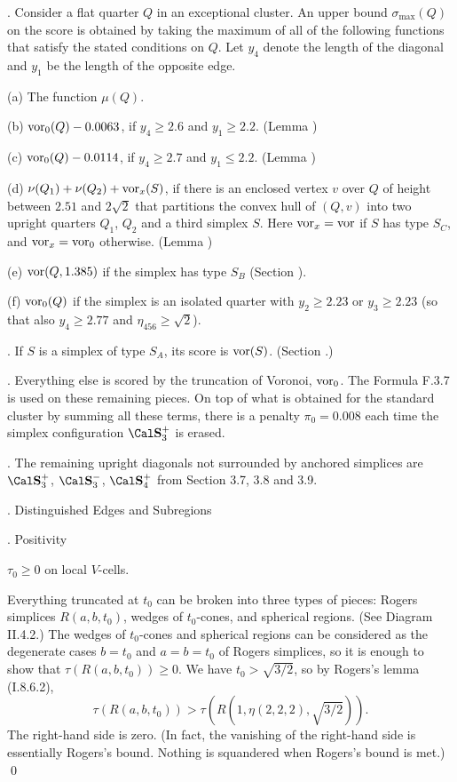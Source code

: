 \smallskip
{}.  Consider a flat quarter $Q$
in an exceptional cluster.  An upper bound $\sigma_{\max}(Q)$
on the score is obtained by taking the maximum 
of all of the following
functions that satisfy the stated conditions on $Q$.  Let $y_4$ denote
the length of the diagonal and $y_1$ be the length of the opposite edge.

(a)  The function $\mu(Q)$.

(b)  $\operatorname{vor}_0(Q) - 0.0063$, if $y_4\ge 2.6$ and $y_1\ge 2.2$.\hfill
	(Lemma )

(c)  $\operatorname{vor}_0(Q) - 0.0114$, if $y_4\ge 2.7$ and $y_1\le 2.2$.
	\hfill (Lemma )

(d)  $\nu(Q_1)+\nu(Q_2)+\operatorname{vor}_x(S)$, if there is an enclosed vertex
	$v$ over $Q$ of height between $2.51$ and $2\sqrt{2}$ that
	partitions the convex hull of $(Q,v)$ into two upright quarters
	$Q_1$, $Q_2$ and a third simplex $S$. Here $\operatorname{vor}_x=\operatorname{vor}$
	if $S$ has type $S_C$, and $\operatorname{vor}_x=\operatorname{vor}_0$ otherwise.
	\hfill (Lemma )

(e)  $\operatorname{vor}(Q,1.385)$ if the simplex has type $S_B$ (Section ).

(f) $\operatorname{vor}_0(Q)$ if the simplex is an isolated quarter with 
	$y_2\ge2.23$ or $y_3\ge2.23$ (so that also $y_4\ge2.77$
	and $\eta_{456}\ge\sqrt2$).

\smallskip

.   If $S$ is a simplex of type $S_A$, its score is $\operatorname{vor}(S)$.
(Section .)

\smallskip

.  Everything else is scored by the truncation of Voronoi, $\operatorname{vor}_0$.
	The Formula F.3.7 is used on these remaining pieces.
	On top of what is obtained for the standard cluster by summing all
these terms, 
there is a penalty $\pi_0=0.008$ each time the simplex configuration
$\Splus$ is erased.

\smallskip
{}.  The remaining upright diagonals not surrounded by
	anchored simplices are
	$\Splus$, $\Sminus$,  $\Sfour$ 
	from Section 3.7, 3.8 and 3.9.






\vfill\eject
\head {}.  Distinguished Edges and Subregions\endhead

\subhead {}. Positivity\endsubhead


  $\tau_{0}\ge 0$ on local $V$-cells.
\endproclaim

  Everything truncated at $t_0$ can be broken into
three types of pieces: Rogers simplices $R(a,b,t_0)$, wedges of
$t_0$-cones,
and spherical regions. (See Diagram II.4.2.)
The wedges of $t_0$-cones and spherical regions can be considered as the
degenerate cases $b=t_0$ and $a=b=t_0$ of Rogers simplices, so it
is enough to show that $\tau(R(a,b,t_0))\ge 0$.
We have $t_0>\sqrt{3/2}$, so by Rogers's lemma (I.8.6.2),
$$\tau(R(a,b,t_0))>\tau(R(1,\eta(2,2,2),\sqrt{3/2})).$$
The right-hand side is zero. (In fact, the vanishing
of the right-hand side is essentially Rogers's bound.  Nothing
is squandered when Rogers's bound is met.)
\qed\enddemo

